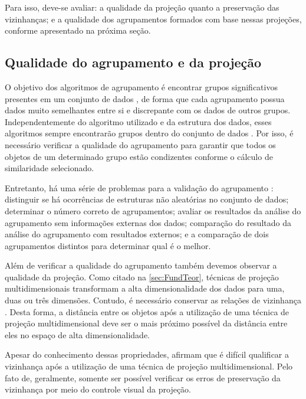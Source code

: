 			Para isso, deve-se avaliar: a qualidade da projeção quanto %
			a preservação das vizinhanças; e a qualidade dos agrupamentos formados com base
			nessas projeções, conforme apresentado na próxima seção.
						
		\subsection{Qualidade do agrupamento e da projeção}
		\label{subsec:qualidade}
			O objetivo dos algoritmos de agrupamento é encontrar grupos significativos
			presentes em um conjunto de dados \cite{Halkidi2001}, de forma que cada agrupamento
			possua dados muito semelhantes entre si e discrepante com os dados de outros grupos.
			Independentemente do algoritmo utilizado e da estrutura dos dados,
			esses algoritmos sempre encontrarão grupos dentro do conjunto de dados
			\cite{Tan:2005:ch8}. Por isso, é necessário verificar a qualidade do
			agrupamento para garantir que todos os objetos de um determinado grupo
			estão condizentes conforme o cálculo de similaridade selecionado.
			
			Entretanto, há uma série de problemas para a validação do agrupamento
			\cite{Tan:2005:ch8}: distinguir se há ocorrências de estruturas não aleatórias
			no conjunto de dados; determinar o número correto de agrupamentos; avaliar os
			resultados da análise do agrupamento sem informações externas dos dados;
			comparação do resultado da análise do agrupamento com resultados externos;
			e a comparação de dois agrupamentos distintos para determinar qual é o melhor.
			
			Além de verificar a qualidade do agrupamento também devemos observar a
			qualidade da projeção. Como citado na \cref{sec:FundTeor}, técnicas de projeção
			multidimensionais transformam a alta dimensionalidade dos dados para uma, duas
			ou três dimensões. Contudo, é necessário conservar as relações de vizinhança
			\cite{bauer1992quantifying}. Desta forma, a distância entre os objetos após a
			utilização de uma técnica de projeção multidimensional deve ser o mais próximo
			possível da distância entre eles no espaço de alta dimensionalidade.
			
			Apesar do conhecimento dessas propriedades, 
			afirmam que é difícil qualificar a vizinhança após a utilização de uma técnica
			de projeção multidimensional. Pelo fato de, geralmente, somente ser possível
			verificar os erros de preservação da vizinhança por meio do controle visual
			da projeção.
			

